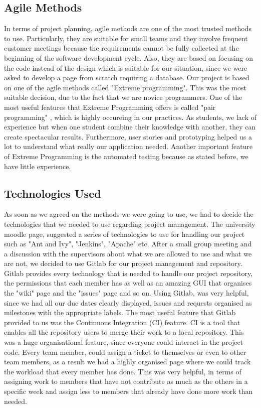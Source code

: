 \documentclass{l3proj}
\begin{document}
\subsection{Agile Methods}
\label{agile}

In terms of project planning, agile methods are one of the most trusted methods to use. Particularly, they are suitable for small teams and they involve frequent customer meetings because the requirements cannot be fully collected at the beginning of the software development cycle. Also, they are based on focusing on the code instead of the design which is suitable for our situation, since we were asked to develop a page from scratch requiring a database. Our project is based on one of the agile methods called "Extreme programming". This was the most suitable decision, due to the fact that we are novice programmers. One of the most useful features that Extreme Programming offers is called "pair programming" , which is highly occureing in our practices. As students, we lack of experience but when one student combine their knowledge with another, they can create spectacular results. Furthermore, user stories and prototyping helped us a lot to understand what really our application needed. Another important feature of Extreme Programming is the automated testing because as stated before, we have little experience.

\subsection{Technologies Used}
\label{tech}

As soon as we agreed on the methods we were going to use, we had to decide the technologies that we needed to use regarding project management. The university moodle page, suggested a series of technologies to use for handling our project such as "Ant and Ivy", "Jenkins", "Apache" etc. After a small group meeting and a discussion with the supervisors about what we are allowed to use and what we are not, we decided to use Gitlab for our project management and repository. Gitlab provides every technology that is needed to handle our project repository, the permissions that each member has as well as an amazing GUI that organises the "wiki" page and the "issues" page and so on. Using Gitlab, was very helpful, since we had all our due dates clearly displayed, issues and requests organised as milestones with the appropriate labels. The most useful feature that Gitlab provided to us was the Continuous Integration (CI) feature. CI is a tool that enables all the repository users to merge their work to a local repository. This was a huge organisational feature, since everyone could interact in the project code. Every team member, could assign a ticket to themselves or even to other team members, as a result we had a highly organised page where we could track the workload that every member has done. This was very helpful, in terms of assigning work to members that have not contribute as much as the others in a specific week and assign less to members that already have done more work than needed.
\end{document}
